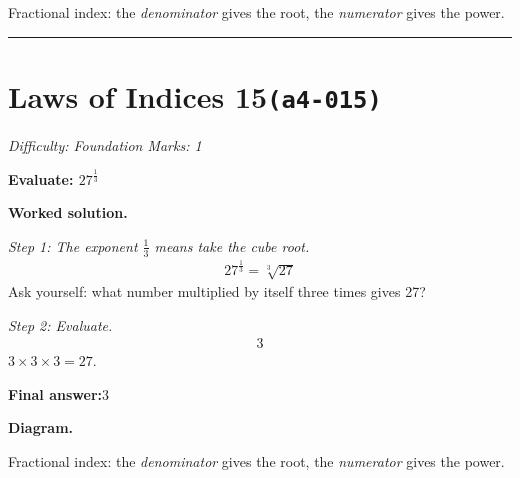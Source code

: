 \documentclass[11pt]{article}
\newcommand{\question}[1]{\par\medskip\noindent\textbf{#1}\par}
\begin{document}
\begin{center}
\end{center}
\small Fractional index: the \emph{denominator} gives the root, the \emph{numerator} gives the power.\normalsize

\medskip\hrule

\section*{Laws of Indices 15\quad\small\texttt{(a4-015)}}
\textit{Difficulty: Foundation \quad\textbar\quad Marks: 1}

\question{Evaluate: \( 27^{\frac{1}{3}} \)}

\textbf{Worked solution.}

\textit{Step 1: The exponent \( \frac{1}{3} \) means take the cube root.}
\[\begin{gathered}
27^{\frac{1}{3}} = \sqrt[3]{27}
\end{gathered}\]
Ask yourself: what number multiplied by itself three times gives 27?

\textit{Step 2: Evaluate.}
\[\begin{gathered}
3
\end{gathered}\]
\( 3 \times 3 \times 3 = 27 \).

\begin{answerbox}
\textbf{Final answer:}\quad \(\displaystyle 3\)
\end{answerbox}
\textbf{Diagram.}

\begin{center}
\end{center}
\small Fractional index: the \emph{denominator} gives the root, the \emph{numerator} gives the power.\normalsize
\end{document}
